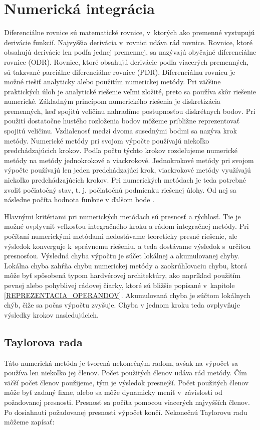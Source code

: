 \chapter{Numerická integrácia} \label{NUM_INTEGRACIA}
Diferenciálne rovnice sú matematické rovnice, v~ktorých ako premenné vystupujú derivácie funkcií. Najvyššia derivácia v~rovnici udáva rád rovnice. Rovnice, ktoré obsahujú derivácie len podľa jednej premennej, sa nazývajú obyčajné diferenciálne rovnice (ODR). Rovnice, ktoré obsahujú derivácie podľa viacerých premenných, sú takzvané parciálne diferenciálne rovnice (PDR).
Diferenciálnu rovnicu je možné riešiť analyticky alebo použitím numerickej metódy. Pri väčšine praktických úloh je analytické riešenie veľmi zložité, preto sa používa skôr riešenie numerické. Základným princípom numerického riešenia je diskretizácia premenných, keď spojitú veličinu nahradíme postupnosťou diskrétnych bodov. Pri použití dostatočne hustého rozloženia bodov môžeme približne reprezentovať spojitú veličinu. Vzdialenosť medzi dvoma susednými bodmi sa nazýva krok metódy. Numerické metódy pri svojom výpočte používajú niekoľko predchádzajúcich krokov. Podľa počtu týchto krokov rozdeľujeme numerické metódy na metódy jednokrokové a viackrokové. Jednokrokové metódy pri svojom výpočte používajú len jeden predchádzajúci krok, viackrokové metódy využívajú niekoľko predchádzajúcich krokov. Pri numerických metódach je teda potrebné zvoliť počiatočný stav, t. j. počiatočnú podmienku riešenej úlohy. Od nej sa následne počíta hodnota funkcie v ďalšom bode \cite{NumMetody}. 

Hlavnými kritériami pri numerických metódach sú presnosť a rýchlosť. Tie je možné ovplyvniť veľkosťou integračného kroku a rádom integračnej metódy. Pri počítaní numerickými metódami nedostávame teoreticky presné riešenie, ale výsledok konverguje k~správnemu riešeniu, a teda dostávame výsledok s~určitou presnosťou. Výsledná chyba výpočtu je súčet lokálnej a akumulovanej chyby.  Lokálna chyba zahŕňa chybu numerickej metódy a zaokrúhľovaciu chybu, ktorá môže byť spôsobená typom hardvérovej architektúry, ako napríklad použitím pevnej alebo pohyblivej rádovej čiarky, ktoré sú bližšie popísané v~kapitole \ref{REPREZENTACIA_OPERANDOV}. Akumulovaná chyba je súčtom lokálnych chýb, čiže sa počas výpočtu zvyšuje. Chyba v jednom kroku teda ovplyvňuje výsledky krokov nasledujúcich.


\section{Taylorova rada}
Táto numerická metóda je tvorená nekonečným radom, avšak na výpočet sa používa len niekoľko jej členov. Počet použitých členov udáva rád metódy. Čím väčší počet členov použijeme, tým je výsledok presnejší. Počet použitých členov môže byť zadaný fixne, alebo sa môže dynamicky meniť v~závislosti od požadovanej presnosti. Presnosť sa počíta pomocou viacerých najvyšších členov. Po dosiahnutí požadovanej presnosti výpočet končí.
Nekonečnú Taylorovu radu môžeme zapísať:

